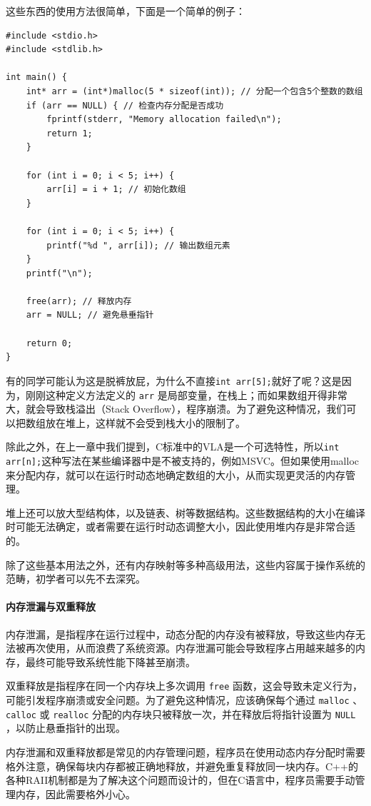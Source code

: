 这些东西的使用方法很简单，下面是一个简单的例子：
\begin{verbatim}
#include <stdio.h>
#include <stdlib.h>

int main() {
    int* arr = (int*)malloc(5 * sizeof(int)); // 分配一个包含5个整数的数组
    if (arr == NULL) { // 检查内存分配是否成功
        fprintf(stderr, "Memory allocation failed\n");
        return 1;
    }

    for (int i = 0; i < 5; i++) {
        arr[i] = i + 1; // 初始化数组
    }

    for (int i = 0; i < 5; i++) {
        printf("%d ", arr[i]); // 输出数组元素
    }
    printf("\n");

    free(arr); // 释放内存
    arr = NULL; // 避免悬垂指针

    return 0;
}
\end{verbatim}
有的同学可能认为这是脱裤放屁，为什么不直接\texttt{int arr[5];}就好了呢？这是因为，刚刚这种定义方法定义的 \verb|arr| 是局部变量，在栈上；而如果数组开得非常大，就会导致栈溢出（Stack Overflow），程序崩溃。为了避免这种情况，我们可以把数组放在堆上，这样就不会受到栈大小的限制了。

除此之外，在上一章中我们提到，C标准中的VLA是一个可选特性，所以\texttt{int arr[n];}这种写法在某些编译器中是不被支持的，例如MSVC。但如果使用malloc来分配内存，就可以在运行时动态地确定数组的大小，从而实现更灵活的内存管理。

堆上还可以放大型结构体，以及链表、树等数据结构。这些数据结构的大小在编译时可能无法确定，或者需要在运行时动态调整大小，因此使用堆内存是非常合适的。

除了这些基本用法之外，还有内存映射等多种高级用法，这些内容属于操作系统的范畴，初学者可以先不去深究。

\paragraph{内存泄漏与双重释放} 

内存泄漏，是指程序在运行过程中，动态分配的内存没有被释放，导致这些内存无法被再次使用，从而浪费了系统资源。内存泄漏可能会导致程序占用越来越多的内存，最终可能导致系统性能下降甚至崩溃。

双重释放是指程序在同一个内存块上多次调用 \verb|free| 函数，这会导致未定义行为，可能引发程序崩溃或安全问题。为了避免这种情况，应该确保每个通过 \verb|malloc| 、 \verb|calloc| 或 \verb|realloc| 分配的内存块只被释放一次，并在释放后将指针设置为 \verb|NULL| ，以防止悬垂指针的出现。

内存泄漏和双重释放都是常见的内存管理问题，程序员在使用动态内存分配时需要格外注意，确保每块内存都被正确地释放，并避免重复释放同一块内存。C++的各种RAII机制都是为了解决这个问题而设计的，但在C语言中，程序员需要手动管理内存，因此需要格外小心。

